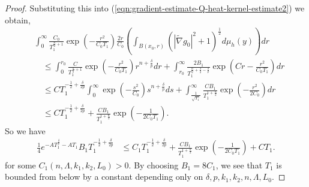 \documentclass[12pt]{amsart}
\theoremstyle{plain}
\theoremstyle{plain}
\theoremstyle{definition}
\theoremstyle{remark}
\numberwithin{equation}{subsection}
\newcommand{\hdel}{\tilde{\nabla}}
\begin{document}
\begin{proof}
    
    Substituting this into (\ref{eqn:gradient-estimate-Q-heat-kernel-estimate2}) we obtain,
    \begin{align*}
        &\int_0^{\infty} \frac{C_0}{T_1^{\frac{n}{2}+1}}\exp\left(-\frac{r^2}{C_0 T_1}\right)\frac{2r}{C_0}\left(\int_{B(x_0, r)}\left(|\hdel g_0|^2 + 1\right)^{\frac{1}{2}}d\mu_h(y)\right)dr \nonumber \\
        &\quad \leq \int_0^{r_0} \frac{C}{T_1^{\frac{n}{2}+1}}\exp\left(-\frac{r^2}{C_0 T_1}\right)r^{n+\frac{\delta}{p}}dr + \int_{r_0}^{\infty} \frac{2B_1}{T_1^{\frac{n}{2}+\frac32-\frac{\delta}{p}}}\exp\left(Cr-\frac{r^2}{C_0 T_1}\right)  dr \nonumber \\
        &\quad \leq CT_1^{-\frac{1}{2}+\frac{\delta}{2p}}\int_0^\infty\exp\left(-\frac{s^2}{C_0}\right)s^{n+\frac{\delta}{p}}ds + \int_{\frac{1}{\sqrt{T_1}}}^\infty \frac{CB_1}{T_1^{1+\frac{n}{2}}}\exp\left(-\frac{r^2}{2C_0} \right) dr\\
        &\quad\leq CT_1^{-\frac{1}{2}+\frac{\delta}{2p}} +  \frac{CB_1}{T_1^{1+\frac{n}{2}}}\exp\left(-\frac{1}{2C_0T_1} \right).
    \end{align*}
  So we have
    \begin{align}\label{eqn:gradient-estimate-Q-heat-kernel-estimate4}
        \frac14 e^{-AT_1^{\frac{\delta}{p}}-AT_1}B_1T_1^{-\frac{1}{2}+\frac{\delta}{2p}} &\leq C_1 T_1^{-\frac{1}{2}+\frac{\delta}{2p}} +  \frac{CB_1}{T_1^{1+\frac{n}{2}}}\exp\left(-\frac{1}{2C_0T_1} \right)+ C T_1.
    \end{align}
    for some $C_1(n,\Lambda,k_1,k_2,L_0)>0$.
 By choosing $B_1=8C_1$, we see that $T_1$ is bounded from below by a constant depending only on $\delta,p,k_1,k_2,n,\Lambda,L_0$.
\end{proof}
\end{document}
